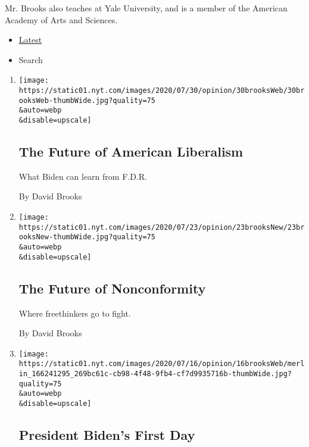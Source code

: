 Mr. Brooks also teaches at Yale University, and is a member of the
American Academy of Arts and Sciences.

\begin{itemize}
\tightlist
\item
  \protect\hyperlink{stream-panel}{Latest}
\item
  Search
\end{itemize}

\begin{enumerate}
\def\labelenumi{\arabic{enumi}.}
\item
  \href{/2020/07/30/opinion/biden-fdr.html}{}

  \texttt{[image: https://static01.nyt.com/images/2020/07/30/opinion/30brooksWeb/30brooksWeb-thumbWide.jpg?quality=75\\\&auto=webp\\\&disable=upscale]}

  \hypertarget{the-future-of-american-liberalism}{%
  \subsection{The Future of American
  Liberalism}\label{the-future-of-american-liberalism}}

  What Biden can learn from F.D.R.

  By David Brooks
\item
  \href{/2020/07/23/opinion/substack-newsletters-writers.html}{}

  \texttt{[image: https://static01.nyt.com/images/2020/07/23/opinion/23brooksNew/23brooksNew-thumbWide.jpg?quality=75\\\&auto=webp\\\&disable=upscale]}

  \hypertarget{the-future-of-nonconformity}{%
  \subsection{The Future of
  Nonconformity}\label{the-future-of-nonconformity}}

  Where freethinkers go to fight.

  By David Brooks
\item
  \href{/2020/07/16/opinion/biden-2020.html}{}

  \texttt{[image: https://static01.nyt.com/images/2020/07/16/opinion/16brooksWeb/merlin\_166241295\_269bc61c-cb98-4f48-9fb4-cf7d9935716b-thumbWide.jpg?quality=75\\\&auto=webp\\\&disable=upscale]}

  \hypertarget{president-bidens-first-day}{%
  \subsection{President Biden's First
  Day}\label{president-bidens-first-day}}


\end{enumerate}

